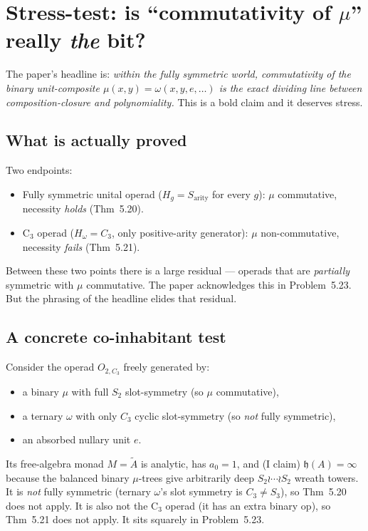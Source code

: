 \documentclass[11pt]{article}
\begin{document}
\section{Stress-test: is ``commutativity of $\mu$'' really \emph{the} bit?}

The paper's headline is: \emph{within the fully symmetric world, commutativity of the binary unit-composite $\mu(x, y) = \omega(x, y, e, \dots)$ is the exact dividing line between composition-closure and polynomiality.} This is a bold claim and it deserves stress.

\subsection*{What is actually proved}

Two endpoints:
\begin{itemize}[leftmargin=1.5em, itemsep=1pt]
  \item Fully symmetric unital operad ($H_g = S_{\mathrm{arity}}$ for every $g$): $\mu$ commutative, necessity \emph{holds} (Thm~5.20).
  \item C$_3$ operad ($H_\omega = C_3$, only positive-arity generator): $\mu$ non-commutative, necessity \emph{fails} (Thm~5.21).
\end{itemize}
Between these two points there is a large residual — operads that are \emph{partially} symmetric with $\mu$ commutative. The paper acknowledges this in Problem~5.23. But the phrasing of the headline elides that residual.

\subsection*{A concrete co-inhabitant test}

Consider the operad $O_{2,C_3}$ freely generated by:
\begin{itemize}[leftmargin=1.5em, itemsep=1pt]
  \item a binary $\mu$ with full $S_2$ slot-symmetry (so $\mu$ commutative),
  \item a ternary $\omega$ with only $C_3$ cyclic slot-symmetry (so \emph{not} fully symmetric),
  \item an absorbed nullary unit $e$.
\end{itemize}
Its free-algebra monad $M = \tilde A$ is analytic, has $a_0 = 1$, and (I claim) $\mathfrak{h}(A) = \infty$ because the balanced binary $\mu$-trees give arbitrarily deep $S_2 \wr \cdots \wr S_2$ wreath towers. It is \emph{not} fully symmetric (ternary $\omega$'s slot symmetry is $C_3 \ne S_3$), so Thm~5.20 does not apply. It is also not the C$_3$ operad (it has an extra binary op), so Thm~5.21 does not apply. It sits squarely in Problem~5.23.
\end{document}
